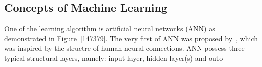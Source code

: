 \subsection{Concepts of Machine Learning}
One of the learning algorithm is artificial neural networks (ANN) as demonstrated in Figure~\ref{147379}. The very first of ANN was proposed by~\citet{McCulloch_1943}, which was inspired by the structre of human neural connections. ANN possess three typical structural layers, namely: input layer, hidden layer(s) and outo